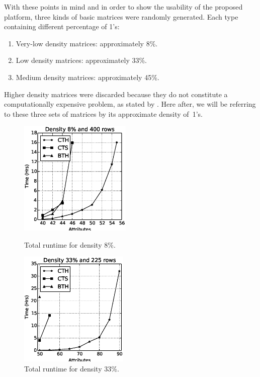 \documentclass[authoryear,preprint,review,12pt]{elsarticle}
\begin{document}
With these points in mind and in order to show the usability of the proposed platform, 
three kinds of basic matrices were randomly generated. Each type containing different percentage of 1's: 
\begin{enumerate}
	\item Very-low density matrices: approximately 8\%.
	\item Low density matrices: approximately 33\%.
	\item Medium density matrices: approximately 45\%.
\end{enumerate}

Higher density matrices were discarded because they do not constitute a computationally expensive problem, 
as stated by \cite{R21}. Here after, we will be referring to these three sets of matrices by its 
approximate density of~1's.

\begin{figure}[htb]
\centering
\begin{minipage}{.5\textwidth}
  \centering
   \includegraphics[width=\linewidth , height=5.5cm]{low_density.eps}
  \caption{Total runtime for density 8\%.}
  \label{fig:result1}
\end{minipage}%
\begin{minipage}{.5\textwidth}
  \centering
   \includegraphics[width=\linewidth , height=5.5cm]{med_density.eps}
  \caption{Total runtime for density 33\%.}
  \label{fig:result2}
\end{minipage}
\end{figure}
\end{document}
